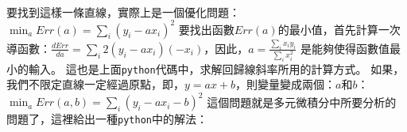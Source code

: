 \documentclass[11pt]{article}
\begin{document}
    \begin{center}
    \end{center}
    { \hspace*{\fill} \\}
    
    要找到這樣一條直線，實際上是一個優化問題：
\(\min_a Err(a) = \sum_i(y_i - ax_i)^2\)
要找出函數\(Err(a)\)的最小值，首先計算一次導函數：\(\frac{dErr}{da} = \sum_i 2(y_i-ax_i)(-x_i)\)，因此，\(a = \frac{\sum_i x_iy_i}{\sum_i x_i^2}\)
是能夠使得函數值最小的輸入。
這也是上面\texttt{python}代碼中，求解回歸線斜率所用的計算方式。
如果，我們不限定直線一定經過原點，即，\(y=ax+b\)，則變量變成兩個：\(a\)和\(b\)：
\(\min_a Err(a,b) = \sum_i(y_i - ax_i-b)^2\)
這個問題就是多元微積分中所要分析的問題了，這裡給出一種\texttt{python}中的解法：
\end{document}
